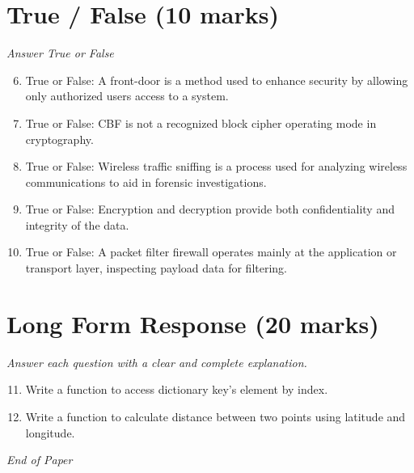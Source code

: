 \documentclass[12pt]{article}
\begin{document}
\section*{True / False (10 marks)}
\textit{Answer True or False}
\begin{enumerate}[label=\arabic*.]
\setcounter{enumi}{5}
\item True or False: A front-door is a method used to enhance security by allowing only authorized users access to a system.
\item True or False: CBF is not a recognized block cipher operating mode in cryptography.
\item True or False: Wireless traffic sniffing is a process used for analyzing wireless communications to aid in forensic investigations.
\item True or False: Encryption and decryption provide both confidentiality and integrity of the data.
\item True or False: A packet filter firewall operates mainly at the application or transport layer, inspecting payload data for filtering.
\end{enumerate}

\section*{Long Form Response (20 marks)}
\textit{Answer each question with a clear and complete explanation.}
\begin{enumerate}[label=\arabic*.]
\setcounter{enumi}{10}
\item Write a function to access dictionary key's element by index.
\item Write a function to calculate distance between two points using latitude and longitude.
\end{enumerate}

\vfill
\noindent\textit{End of Paper}
\end{document}
